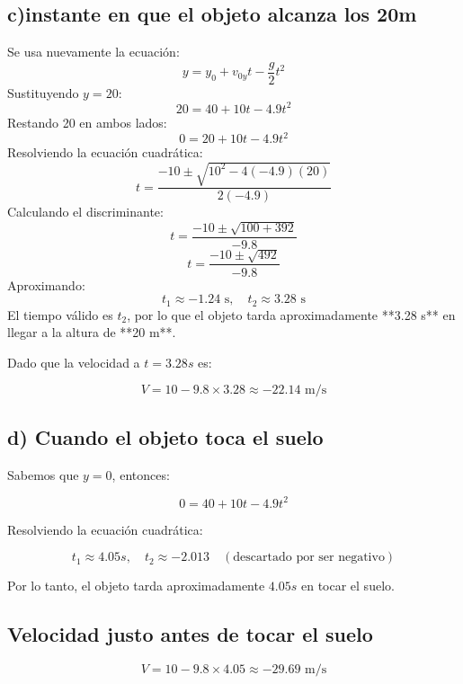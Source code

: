 \subsection{c)instante en que el objeto alcanza los 20m}

Se usa nuevamente la ecuación:
\begin{equation}
    y = y_0 + v_{0y}t - \frac{g}{2} t^2
\end{equation}
Sustituyendo $y = 20$:
\begin{equation}
    20 = 40 + 10t - 4.9t^2
\end{equation}
Restando 20 en ambos lados:
\begin{equation}
    0 = 20 + 10t - 4.9t^2
\end{equation}
Resolviendo la ecuación cuadrática:
\begin{equation}
    t = \frac{-10 \pm \sqrt{10^2 - 4(-4.9)(20)}}{2(-4.9)}
\end{equation}
Calculando el discriminante:
\begin{equation}
    t = \frac{-10 \pm \sqrt{100 + 392}}{-9.8}
\end{equation}
\begin{equation}
    t = \frac{-10 \pm \sqrt{492}}{-9.8}
\end{equation}
Aproximando:
\begin{equation}
    t_1 \approx -1.24 \text{ s}, \quad t_2 \approx 3.28 \text{ s}
\end{equation}
El tiempo válido es $t_2$, por lo que el objeto tarda aproximadamente **3.28 s** en llegar a la altura de **20 m**.

Dado que la velocidad a $t = 3.28s$ es:

\begin{equation}
V = 10 - 9.8 \times 3.28 \approx -22.14 \text{ m/s}
\end{equation}

\subsection*{d) Cuando el objeto toca el suelo}
Sabemos que $y = 0$, entonces:

\begin{equation}
0 = 40 + 10t - 4.9t^2
\end{equation}

Resolviendo la ecuación cuadrática:

\begin{equation}
t_1 \approx 4.05s, \quad t_2 \approx -2.013 \quad (\text{descartado por ser negativo})
\end{equation}

Por lo tanto, el objeto tarda aproximadamente $4.05s$ en tocar el suelo.

\subsection*{Velocidad justo antes de tocar el suelo}

\begin{equation}
V = 10 - 9.8 \times 4.05 \approx -29.69 \text{ m/s}
\end{equation}



